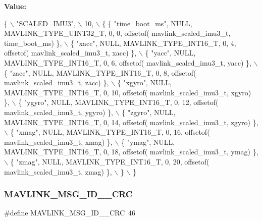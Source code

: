{\bfseries Value\+:}
\begin{DoxyCode}
\{ \(\backslash\)
    \textcolor{stringliteral}{"SCALED\_IMU3"}, \(\backslash\)
    10, \(\backslash\)
    \{  \{ \textcolor{stringliteral}{"time\_boot\_ms"}, NULL, MAVLINK_TYPE_UINT32_T, 0, 0, offsetof(
      mavlink_scaled_imu3_t, time\_boot\_ms) \}, \(\backslash\)
         \{ \textcolor{stringliteral}{"xacc"}, NULL, MAVLINK_TYPE_INT16_T, 0, 4, offsetof(
      mavlink_scaled_imu3_t, xacc) \}, \(\backslash\)
         \{ \textcolor{stringliteral}{"yacc"}, NULL, MAVLINK_TYPE_INT16_T, 0, 6, offsetof(
      mavlink_scaled_imu3_t, yacc) \}, \(\backslash\)
         \{ \textcolor{stringliteral}{"zacc"}, NULL, MAVLINK_TYPE_INT16_T, 0, 8, offsetof(
      mavlink_scaled_imu3_t, zacc) \}, \(\backslash\)
         \{ \textcolor{stringliteral}{"xgyro"}, NULL, MAVLINK_TYPE_INT16_T, 0, 10, offsetof(
      mavlink_scaled_imu3_t, xgyro) \}, \(\backslash\)
         \{ \textcolor{stringliteral}{"ygyro"}, NULL, MAVLINK_TYPE_INT16_T, 0, 12, offsetof(
      mavlink_scaled_imu3_t, ygyro) \}, \(\backslash\)
         \{ \textcolor{stringliteral}{"zgyro"}, NULL, MAVLINK_TYPE_INT16_T, 0, 14, offsetof(
      mavlink_scaled_imu3_t, zgyro) \}, \(\backslash\)
         \{ \textcolor{stringliteral}{"xmag"}, NULL, MAVLINK_TYPE_INT16_T, 0, 16, offsetof(
      mavlink_scaled_imu3_t, xmag) \}, \(\backslash\)
         \{ \textcolor{stringliteral}{"ymag"}, NULL, MAVLINK_TYPE_INT16_T, 0, 18, offsetof(
      mavlink_scaled_imu3_t, ymag) \}, \(\backslash\)
         \{ \textcolor{stringliteral}{"zmag"}, NULL, MAVLINK_TYPE_INT16_T, 0, 20, offsetof(
      mavlink_scaled_imu3_t, zmag) \}, \(\backslash\)
         \} \(\backslash\)
\}
\end{DoxyCode}
\mbox{\label{mavlink__msg__scaled__imu3_8h_aa3dab7bfbdbd6842d96e49628e434254}} 
\subsubsection{M\+A\+V\+L\+I\+N\+K\+\_\+\+M\+S\+G\+\_\+\+I\+D\+\_\+\_\+\+C\+RC}
{\footnotesize\ttfamily \#define M\+A\+V\+L\+I\+N\+K\+\_\+\+M\+S\+G\+\_\+\+I\+D\+\_\+\_\+\+C\+RC~46}

